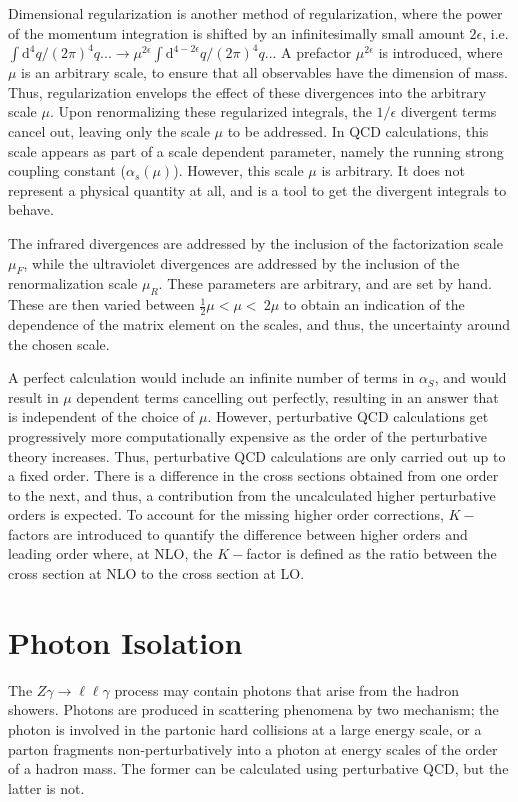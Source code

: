 \documentclass[12pt,a4paper,openright,twoside]{report}
\newcommand{\Zg}{$Z\gamma\to \ell\ell\gamma$ }
\begin{document}
Dimensional regularization is another method of regularization, where the power of the momentum integration is shifted by an infinitesimally small amount $2\epsilon$, i.e. $\int \mathrm{d}^4q/(2\pi)^4 q... \to \mu^{2\epsilon}\int \mathrm{d}^{4-2\epsilon}q/(2\pi)^4 q...$ A prefactor $\mu^{2\epsilon}$ is introduced, where $\mu$ is an arbitrary scale, to ensure that all observables have the dimension of mass. Thus, regularization envelops the effect of these divergences into the arbitrary scale $\mu$. Upon renormalizing these regularized integrals, the $1/\epsilon$ divergent terms cancel out, leaving only the scale $\mu$ to be addressed. In QCD calculations, this scale appears as part of a scale dependent parameter, namely the running strong coupling constant ($\alpha_s(\mu)$). However, this scale $\mu$ is arbitrary. It does not represent a physical quantity at all, and is a tool to get the divergent integrals to behave.

The infrared divergences are addressed by the inclusion of the factorization scale $\mu_F$, while the ultraviolet divergences are addressed by the inclusion of the renormalization scale $\mu_R$. These parameters are arbitrary, and are set by hand. These are then varied between $\frac{1}{2}\mu < \mu < \ 2\mu$ to obtain an indication of the dependence of the matrix element on the scales, and thus, the uncertainty around the chosen scale. 

A perfect calculation would include an infinite number of terms in $\alpha_S$, and would result in $\mu$ dependent terms cancelling out perfectly, resulting in an answer that is independent of the choice of $\mu$. However, perturbative QCD calculations get progressively more computationally expensive as the order of the perturbative theory increases. Thus, perturbative QCD calculations are only carried out up to a fixed order. There is a difference in the cross sections obtained from one order to the next, and thus, a contribution from the uncalculated higher perturbative orders is expected. To account for the missing higher order corrections, $K-$factors are introduced to quantify the difference between higher orders and leading order where, at NLO, the $K-$factor is defined as the ratio between the cross section at NLO to the cross section at LO.

\section{Photon Isolation}\label{sec:Isolation}
The \Zg process may contain photons that arise from the hadron showers. Photons are produced in scattering phenomena by two mechanism; the photon is involved in the partonic hard collisions at a large energy scale, or a parton fragments non-perturbatively into a photon at energy scales of the order of a hadron mass. The former can be calculated using perturbative QCD, but the latter is not.
\end{document}
